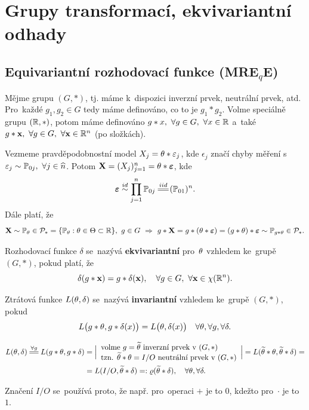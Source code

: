 \chapter{Grupy transformací, ekvivariantní odhady}

\section{Equivariantní rozhodovací funkce (MRE$_q$E)}
\begin{define}
	Mějme grupu $(G,\ast)$, tj. máme k~dispozici inverzní prvek, neutrální prvek, atd. Pro~každé $g_1,g_2\in G$ tedy máme definováno, co to je $g_1\ast g_2$. Volme speciálně grupu $(\mathbb{R},\ast)$, potom máme definováno $g\ast x,~\forall g\in G,~\forall x\in \mathbb{R} $ a~také $g\ast \textbf{x},~\forall g\in G,~\forall \textbf{x}\in\mathbb{R}^n$ (po složkách).
	
	Vezmeme pravděpodobnostní model $X_j=\theta\ast \varepsilon_j$, kde $\epsilon_j$ značí chyby měření s~$\varepsilon_j\sim \mathbb{P}_{0j},~\forall j\in\widehat{n}$. Potom $\textbf{X}=(X_j)_{j=1}^n=\theta\ast\boldsymbol{\varepsilon}$, kde $$\boldsymbol{\epsilon}\stackrel{id}{\sim}\prod_{j=1}^n \PP_{0j}\equal{iid}(\PP_{01})^n.$$
	Dále platí, že $$ \textbf{X}\sim \mathbb{P}_\theta\in\mathcal{P}_\ast=\{\mathbb{P}_\theta:\theta\in\Theta\subset \mathbb{R}\}, ~g\in G~\Rightarrow~ g\ast \textbf{X}=g\ast(\theta\ast\boldsymbol{\varepsilon})=(g\ast\theta)\ast\boldsymbol{\varepsilon}\sim \mathbb{P}_{g\ast \theta}\in \mathcal{P}_\ast.$$ 
\end{define}
\begin{define}
	Rozhodovací funkce $\delta$ se~nazývá \textbf{ekvivariantní} pro~$\theta$ vzhledem ke~grupě $(G,\ast)$, pokud platí, že $$ \delta(g\ast\textbf{x})=g\ast \delta(\textbf{x}),\quad \forall g\in G,~\forall \textbf{x}\in\chi(\mathbb{R}^n).$$
\end{define}
\begin{define}
	Ztrátová funkce $L(\theta,\delta)$ se~nazývá \textbf{invariantní} vzhledem ke~grupě $(G,\ast)$, pokud $$ L\big(g\ast\theta,g\ast\delta(x)\big)=L\big(\theta,\delta(x)\big)\quad\forall \theta,\forall g,\forall \delta.$$
\end{define}
\begin{dusl}
	\[
	\begin{split}
	L(\t,\delta)\equal{\forall g}L(g\ast\t,g\ast \delta)&=\Big| \begin{array}{l}
	\text{volme }g=\widetilde{\t}\text{ inverzní prvek v~}(G,\ast)\\\text{tzn. }\widetilde{\t}\ast\t=I/O\text{ neutrální prvek v~}(G,\ast)
	\end{array}
	\Big|=L(\widetilde{\t}\ast\t,\widetilde{\t}\ast\delta)=\\&=L(I/O,\widetilde{\t}\ast\delta)=:\rho(\widetilde{\t}\ast\delta),\quad\forall\t,\forall\delta.
	\end{split}
	\] 
	
	Značení $I/O$ se~používá proto, že např. pro~operaci $+$ je to $0$, kdežto pro~$\cdot$ je to $1$.
\end{dusl}
